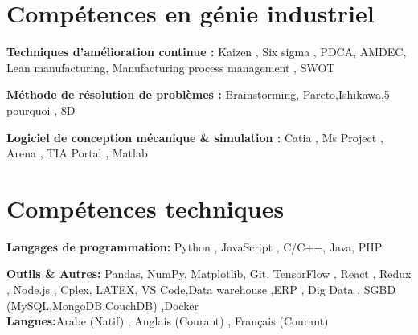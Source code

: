 \documentclass[letterpaper,11pt]{article}
\newcommand{\resumeSubHeadingListStart}{\begin{itemize}[leftmargin=0.15in, label={}]}
\newcommand{\resumeSubHeadingListEnd}{\end{itemize}}
\begin{document}
\section{Compétences en génie industriel
}
  \vspace{2pt}
  \resumeSubHeadingListStart
    \small{\item{
        \textbf{Techniques d'amélioration continue :}{ Kaizen , Six sigma , PDCA, AMDEC, Lean manufacturing, Manufacturing process management , SWOT
} \\ \vspace{3pt}
        
        \textbf{Méthode de résolution de problèmes :}{ Brainstorming, Pareto,Ishikawa,5 pourquoi , 8D} \\ \vspace{3pt}
        
        \textbf{Logiciel de conception mécanique \& simulation : }{ Catia , Ms Project , Arena , TIA Portal , Matlab}
        
    }}
  \resumeSubHeadingListEnd


\section{Compétences techniques}
  \vspace{2pt}
  \resumeSubHeadingListStart
    \small{\item{
        \textbf{Langages de programmation:}{ Python , JavaScript , C/C++, Java, PHP
} \\ \vspace{3pt}
        
        \textbf{Outils \& Autres:}{ Pandas, NumPy, Matplotlib, Git, TensorFlow , React , Redux , Node.js , Cplex, LATEX, VS Code,Data warehouse ,ERP , Dig Data , SGBD (MySQL,MongoDB,CouchDB) ,Docker} \\ \vspace{3pt}
         \textbf{Langues:}{Arabe (Natif) , Anglais (Courant) , Français (Courant)
} \\ \vspace{3pt}
        
    }}
  \resumeSubHeadingListEnd
\end{document}
